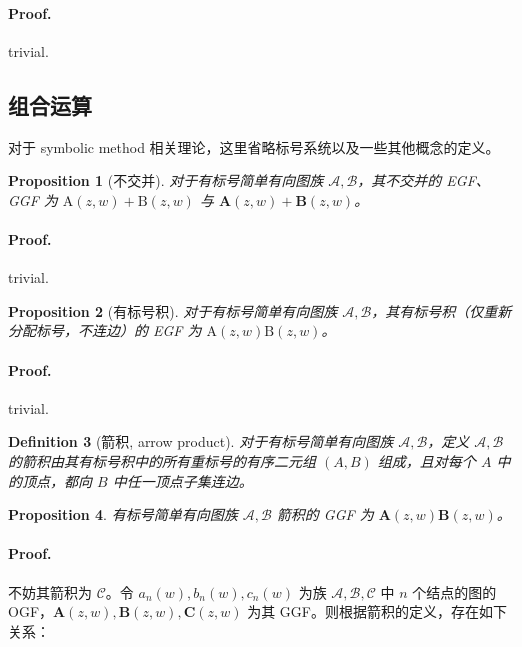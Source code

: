 \documentclass[10pt,a4paper,oneside]{article}
\newtheorem{definition}{Definition}[section]
\newtheorem{proposition}[definition]{Proposition}
\begin{document}
\paragraph{Proof.} trivial.

\subsection{组合运算}

对于 symbolic method 相关理论，这里省略标号系统以及一些其他概念的定义。

\begin{proposition}[不交并]
    对于有标号简单有向图族 $\mathcal{A},\mathcal{B}$，其不交并的 EGF、GGF 为 $\mathrm A(z,w)+\mathrm B(z,w)$ 与 $\mathbf{A}(z,w)+\mathbf{B}(z,w)$。
\end{proposition}

\paragraph{Proof.} trivial.

\begin{proposition}[有标号积]
    对于有标号简单有向图族 $\mathcal{A},\mathcal{B}$，其有标号积（仅重新分配标号，不连边）的 EGF 为 $\mathrm A(z,w)\mathrm B(z,w)$。
\end{proposition}

\paragraph{Proof.} trivial.

\begin{definition}[箭积, arrow product]
    对于有标号简单有向图族 $\mathcal{A},\mathcal{B}$，定义 $\mathcal{A},\mathcal{B}$ 的箭积由其有标号积中的所有重标号的有序二元组 $(A,B)$ 组成，且对每个 $A$ 中的顶点，都向 $B$ 中任一顶点子集连边。
\end{definition}

\begin{proposition}
    有标号简单有向图族 $\mathcal{A},\mathcal{B}$ 箭积的 GGF 为 $\mathbf{A}(z,w)\mathbf{B}(z,w)$。
\end{proposition}

\paragraph{Proof.} 不妨其箭积为 $\mathcal{C}$。令 $a_n(w),b_n(w),c_n(w)$ 为族 $\mathcal{A},\mathcal{B},\mathcal{C}$ 中 $n$ 个结点的图的 OGF，$\mathbf{A}(z,w),\mathbf{B}(z,w),\mathbf{C}(z,w)$ 为其 GGF。则根据箭积的定义，存在如下关系：
\end{document}

